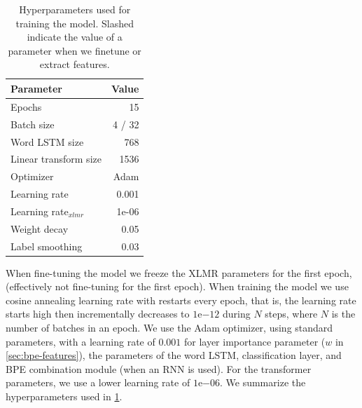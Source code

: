 \documentclass[11pt]{article}
\begin{document}
    	\begin{table}
		\centering
		\begin{tabular}{lr} \\
			Parameter & Value \\
			\hline
			Epochs & 15 \\
			Batch size & 4 / 32 \\
            Word LSTM size & 768 \\
            Linear transform size & 1536 \\
			Optimizer & Adam \\
			Learning rate & 0.001 \\
			Learning rate$_{xlmr}$ & 1e-06 \\
            Weight decay & 0.05 \\
			Label smoothing & 0.03 \\
		\end{tabular}
    		\caption{\label{tab:parameters} Hyperparameters used for
     training the model. Slashed indicate the value of a parameter
     when we finetune or extract features.}
	\end{table}
     
         When fine-tuning the model we freeze the XLMR parameters for
     the first epoch, (effectively not fine-tuning for the first
     epoch).  When training the model we use cosine annealing learning
     rate with restarts every epoch, that is, the learning rate starts
     high then incrementally decreases to $1\mathrm{e}{-12}$ during
     $N$ steps, where $N$ is the number of batches in an epoch. We use
     the Adam optimizer, using standard parameters, with a learning
     rate of $0.001$ for layer importance parameter ($w$ in
     \cref{sec:bpe-features}), the parameters of the word LSTM,
     classification layer, and BPE combination module (when an RNN is
     used). For the transformer parameters, we use a lower learning
     rate of $1\mathrm{e}{-06}$. We summarize the hyperparameters used
     in \cref{tab:parameters}.
\end{document}
